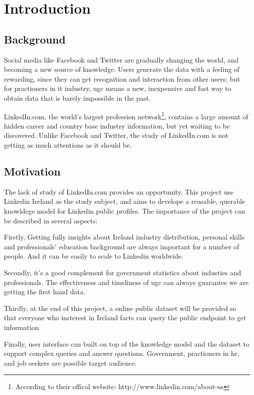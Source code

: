 \chapter{Introduction}

\section{Background}
Social media like Facebook and Twitter are gradually changing the world, and becoming a new source of knowledge. Users generate the data with a feeling of rewarding, since they can get recognition and interaction from other users\cite{krumm2008user}; but for practioners in \gls{it} industry, \gls{ugc} means a new, inexpensive and fast way to obtain data that is barely impossible in the past.

LinkedIn.com, the world's largest profession network\footnote{According to their offical website: http://www.linkedin.com/about-us}, contains a large amount of hidden career and country base industry information, but yet waiting to be discovered. Unlike Facebook and Twitter, the study of LinkedIn.com is not getting as much attentions as it should be. 

\section{Motivation}
The lack of study of LinkedIn.com provides an opportunity. This project use Linkedin Ireland as the study subject, and aims to develope a reusable, querable knowldege model for Linkedin public profiles. The importance of the project can be described in several aspects:

Firstly, Getting fully insights about Ireland industry distribution, personal skills and professionals' education background are always important for a number of people. And it can be easily to scale to Linkedin worldwide.

Secondly, it's a good complement for government statistics about industies and professionals. The effectiveness and timeliness of \acrshort{ugc} can always guarantee we are getting the first hand data.

Thirdly, at the end of this project, a online public dataset will be provided so that everyone who insterest in Ireland facts can query the public endpoint to get information.

Finally, user interface can built on top of the knowledge model and the dataset to support complex queries and answer questions. Government, practioners in \gls{hr}, and job seekers are possible target audience.


